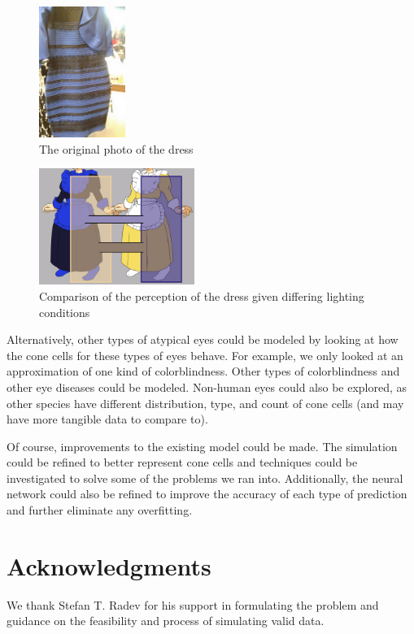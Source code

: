 \documentclass[titlepage]{article}
\begin{document}
\begin{figure}[H]
    \centering
    \includegraphics[width=0.25\textwidth]{figs/the_dress_original.jpg}
    \caption{The original photo of the dress \cite{thedress}}
    \label{fig:the_dress_original}
\end{figure}

\begin{figure}[H]
    \centering
    \includegraphics[width=0.45\textwidth]{figs/the_dress.png}
    \caption{Comparison of the perception of the dress given differing lighting conditions \cite{thedress}}
    \label{fig:the_dress}
\end{figure}

Alternatively, other types of atypical eyes could be modeled by looking at how the cone cells for these types of eyes behave. For example, we only looked at an approximation of one kind of colorblindness. Other types of colorblindness and other eye diseases could be modeled. Non-human eyes could also be explored, as other species have different distribution, type, and count of cone cells (and may have more tangible data to compare to).

\bigskip

Of course, improvements to the existing model could be made. The simulation could be refined to better represent cone cells and techniques could be investigated to solve some of the problems we ran into. Additionally, the neural network could also be refined to improve the accuracy of each type of prediction and further eliminate any overfitting.

\section*{Acknowledgments}

We thank Stefan T. Radev for his support in formulating the problem and guidance on the feasibility and process of simulating valid data.

\newpage
\printbibliography[title=References]
\end{document}

